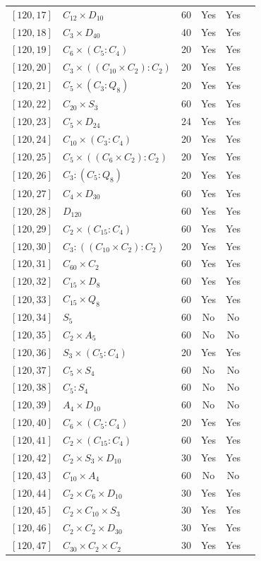 \documentclass[12pt, a4paper]{article}
\theoremstyle{plain}
\theoremstyle{definition}
\begin{document}
\begin{longtable}{llcccl}
  $[120,17]$ & $C_{12} \times D_{10}$ & 60 & Yes & Yes \\
  $[120,18]$ & $C_3 \times D_{40}$ & 40 & Yes & Yes \\
  $[120,19]$ & $C_6 \times (C_5 : C_4)$ & 20 & Yes & Yes \\
  $[120,20]$ & $C_3 \times ((C_{10} \times C_2) : C_2)$ & 20 & Yes & Yes \\
  $[120,21]$ & $C_5 \times (C_3 : Q_8)$ & 20 & Yes & Yes \\
  $[120,22]$ & $C_{20} \times S_3$ & 60 & Yes & Yes \\
  $[120,23]$ & $C_5 \times D_{24}$ & 24 & Yes & Yes \\
  $[120,24]$ & $C_{10} \times (C_3 : C_4)$ & 20 & Yes & Yes \\
  $[120,25]$ & $C_5 \times ((C_6 \times C_2) : C_2)$ & 20 & Yes & Yes \\
  $[120,26]$ & $C_3 : (C_5 : Q_8)$ & 20 & Yes & Yes \\
  $[120,27]$ & $C_4 \times D_{30}$ & 60 & Yes & Yes \\
  $[120,28]$ & $D_{120}$ & 60 & Yes & Yes \\
  $[120,29]$ & $C_2 \times (C_{15} : C_4)$ & 60 & Yes & Yes \\
  $[120,30]$ & $C_3 : ((C_{10} \times C_2) : C_2)$ & 20 & Yes & Yes \\
  $[120,31]$ & $C_{60} \times C_2$ & 60 & Yes & Yes \\
  $[120,32]$ & $C_{15} \times D_8$ & 60 & Yes & Yes \\
  $[120,33]$ & $C_{15} \times Q_8$ & 60 & Yes & Yes \\
  $[120,34]$ & $S_5$ & 60 & No & No \\
  $[120,35]$ & $C_2 \times A_5$ & 60 & No & No \\
  $[120,36]$ & $S_3 \times (C_5 : C_4)$ & 20 & Yes & Yes \\
  $[120,37]$ & $C_5 \times S_4$ & 60 & No & No \\
  $[120,38]$ & $C_5 : S_4$ & 60 & No & No \\
  $[120,39]$ & $A_4 \times D_{10}$ & 60 & No & No \\
  $[120,40]$ & $C_6 \times (C_5 : C_4)$ & 20 & Yes & Yes \\
  $[120,41]$ & $C_2 \times (C_{15} : C_4)$ & 60 & Yes & Yes \\
  $[120,42]$ & $C_2 \times S_3 \times D_{10}$ & 30 & Yes & Yes \\
  $[120,43]$ & $C_{10} \times A_4$ & 60 & No & No \\
  $[120,44]$ & $C_2 \times C_6 \times D_{10}$ & 30 & Yes & Yes \\
  $[120,45]$ & $C_2 \times C_{10} \times S_3$ & 30 & Yes & Yes \\
  $[120,46]$ & $C_2 \times C_2 \times D_{30}$ & 30 & Yes & Yes \\
  $[120,47]$ & $C_{30} \times C_2 \times C_2$ & 30 & Yes & Yes \\
\end{longtable}
\end{document}
